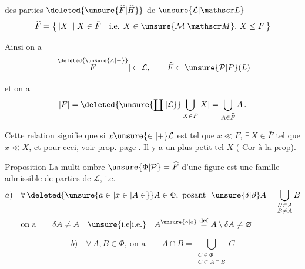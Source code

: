 des parties $\deleted{\unsure{\widehat F|\widehat H}}$ de $\unsure{\mathcal L|\mathscr L}$
\[
\widehat F=\bigl\{\,\lvert X\rvert\mid X\in\bar F\quad\text{i.e. }X\in\unsure{\mathcal M|\mathscr M},\,X\leq F\,\bigr\}
\]

Ainsi on a
\[
\lvert\overset{\deleted{\unsure{\wedge|{-}}}}{F}\rvert\subset\mathcal L,\qquad
\widehat F\subset\unsure{\mathcal P|P}(L)
\]

et on a
\[
\lvert F\rvert=\deleted{\unsure{\coprod|\mathcal L}}\bigcup_{X\in\bar F}\lvert X\rvert=\bigcup_{A\in\widehat F}A\,.
\]

Cette relation signifie que si $x\unsure{\in|+}\mathcal L$ est tel que $x\ll F$, $\exists\,X\in\bar F$ tel que $x\ll X$, \unsure{\S|(*)} 
et pour ceci, voir prop. page . Il y a  un plus petit tel $X$ (\unsure{=|:} Cor à la prop).

\uline{Proposition} La multi-ombre $\unsure{\Phi|\mathcal P}=\widehat F$ d'une figure est une famille \uline{admissible} de parties de $\mathcal L$, i.e.
\[
\begin{aligned}
a)\quad &\forall\,\deleted{\unsure{a\in|x\in|A\in}}A\in\Phi,\ \text{posant }\ \unsure{\delta|\partial}A=\bigcup_{\substack{B\subset A\\B\neq A}}B\\
&\text{on a}\qquad \delta A\neq A\quad\text{\unsure{i.e|i.e.}}\quad A^{\unsure{\circ|o}}\overset{\mathrm{def}}{=}A\setminus\delta A\neq\varnothing
\end{aligned}
\]

\[
b)\quad \forall\,A,B\in\Phi,\ \text{on a}\qquad A\cap B=\bigcup_{\substack{C\in\Phi\\C\subset A\cap B}}C
\]
